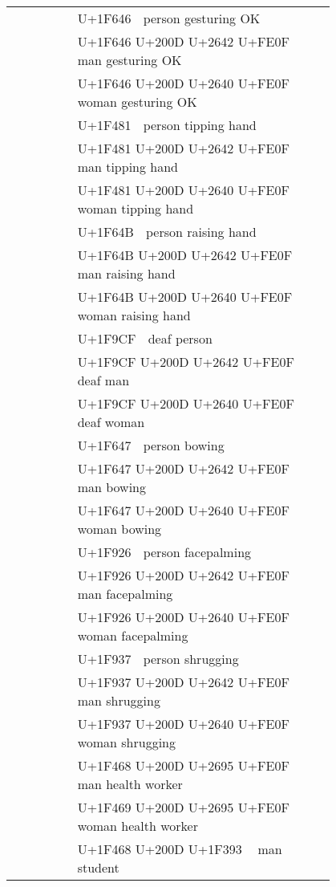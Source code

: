\documentclass[a4paper,12pt]{ltjarticle}
\newcommand{\fontA}[1]{{\fontspec[RawFeature={mode=harf,+dist,+ccmp}]{Segoe UI Emoji} #1}}
\newcommand{\fontB}[1]{{\fontspec[RawFeature={mode=harf,+dist,+ccmp}]{Noto Color Emoji} #1}}
\begin{document}
\begin{longtable}[c]{ccp{0.8\linewidth}}
\fontA{🙆}&\fontB{🙆}&U+1F646 🙆 person gesturing OK\\
\fontA{🙆‍♂️}&\fontB{🙆‍♂️}&U+1F646 U+200D U+2642 U+FE0F 🙆‍♂️ man gesturing OK\\
\fontA{🙆‍♀️}&\fontB{🙆‍♀️}&U+1F646 U+200D U+2640 U+FE0F 🙆‍♀️ woman gesturing OK\\
\fontA{💁}&\fontB{💁}&U+1F481 💁 person tipping hand\\
\fontA{💁‍♂️}&\fontB{💁‍♂️}&U+1F481 U+200D U+2642 U+FE0F 💁‍♂️ man tipping hand\\
\fontA{💁‍♀️}&\fontB{💁‍♀️}&U+1F481 U+200D U+2640 U+FE0F 💁‍♀️ woman tipping hand\\
\fontA{🙋}&\fontB{🙋}&U+1F64B 🙋 person raising hand\\
\fontA{🙋‍♂️}&\fontB{🙋‍♂️}&U+1F64B U+200D U+2642 U+FE0F 🙋‍♂️ man raising hand\\
\fontA{🙋‍♀️}&\fontB{🙋‍♀️}&U+1F64B U+200D U+2640 U+FE0F 🙋‍♀️ woman raising hand\\
\fontA{🧏}&\fontB{🧏}&U+1F9CF 🧏 deaf person\\
\fontA{🧏‍♂️}&\fontB{🧏‍♂️}&U+1F9CF U+200D U+2642 U+FE0F 🧏‍♂️ deaf man\\
\fontA{🧏‍♀️}&\fontB{🧏‍♀️}&U+1F9CF U+200D U+2640 U+FE0F 🧏‍♀️ deaf woman\\
\fontA{🙇}&\fontB{🙇}&U+1F647 🙇 person bowing\\
\fontA{🙇‍♂️}&\fontB{🙇‍♂️}&U+1F647 U+200D U+2642 U+FE0F 🙇‍♂️ man bowing\\
\fontA{🙇‍♀️}&\fontB{🙇‍♀️}&U+1F647 U+200D U+2640 U+FE0F 🙇‍♀️ woman bowing\\
\fontA{🤦}&\fontB{🤦}&U+1F926 🤦 person facepalming\\
\fontA{🤦‍♂️}&\fontB{🤦‍♂️}&U+1F926 U+200D U+2642 U+FE0F 🤦‍♂️ man facepalming\\
\fontA{🤦‍♀️}&\fontB{🤦‍♀️}&U+1F926 U+200D U+2640 U+FE0F 🤦‍♀️ woman facepalming\\
\fontA{🤷}&\fontB{🤷}&U+1F937 🤷 person shrugging\\
\fontA{🤷‍♂️}&\fontB{🤷‍♂️}&U+1F937 U+200D U+2642 U+FE0F 🤷‍♂️ man shrugging\\
\fontA{🤷‍♀️}&\fontB{🤷‍♀️}&U+1F937 U+200D U+2640 U+FE0F 🤷‍♀️ woman shrugging\\
\fontA{👨‍⚕️}&\fontB{👨‍⚕️}&U+1F468 U+200D U+2695 U+FE0F 👨‍⚕️ man health worker\\
\fontA{👩‍⚕️}&\fontB{👩‍⚕️}&U+1F469 U+200D U+2695 U+FE0F 👩‍⚕️ woman health worker\\
\fontA{👨‍🎓}&\fontB{👨‍🎓}&U+1F468 U+200D U+1F393 👨‍🎓 man student\\

\end{longtable}
\end{document}
